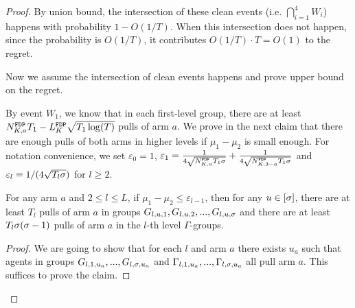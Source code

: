 \begin{proof}
By union bound, the intersection of these clean events (i.e. $\bigcap_{i=1}^4 W_i$) happens with probability $1-O(1/T)$. When this intersection does not happen, since the probability is $O(1/T)$, it contributes $O(1/T) \cdot T = O(1)$ to the regret.

Now we assume the intersection of clean events happens and prove upper bound on the regret.

By event $W_1$, we know that in each first-level group, there are at least $\fdpN T_1- \GdT \sqrt{T_1\log(T)}$ pulls of arm $a$. We prove in the next claim that there are enough pulls of both arms in higher levels if $\mu_1-\mu_2$ is small enough. For notation convenience, we set $\varepsilon_0 = 1$, $\varepsilon_1 = \frac{1}{4\sqrt{\fdpN T_1\NG}} + \frac{1}{4\sqrt{\fdpN[3-a] T_1\NG}}$ and $\varepsilon_l = 1/(4\sqrt{T_l\NG})$ for $l \geq 2$.

\begin{claim}
\label{clm:l2_explore}
For any arm $a$ and $2\leq l \leq L$, if $\mu_1 - \mu_2 \leq \varepsilon_{l-1}$, then for any $u \in [\NG]$, there are at least $T_l$ pulls of arm $a$ in groups $G_{l,u,1},G_{l,u,2}, ... ,G_{l,u,\NG}$ and there are at least $T_l\NG(\NG-1)$ pulls of arm $a$ in the $l$-th level $\Gamma$-groups.
\end{claim}

\begin{proof}
We are going to show that for each $l$ and arm $a$ there exists $u_a$ such that agents in groups $G_{l,1,u_a},...,G_{l,\NG,u_a}$ and $\Gamma_{l,1,u_a},...,\Gamma_{l,\NG,u_a}$ all pull arm $a$. This suffices to prove the claim.


\end{proof}
\end{proof}
